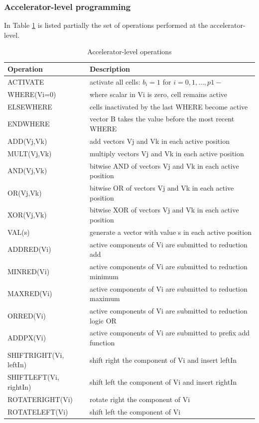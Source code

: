 \subsubsection{Accelerator-level programming}

In Table \ref{ops} is listed partially the set of operations performed at the accelerator-level.


\begin{table}[h]
	\centering                       
	\caption{Accelerator-level operations}           
	\label{ops}       %

	\begin{tabular}{|l|l|} \hline  %
		Operation & Description  \\ \hline \hline
        ACTIVATE    & activate all cells: $b_i=1$ for $i = 0,1,\ldots ,p1-$ \\ \hline
        WHERE(Vi=0) & where scalar in Vi is zero, cell remains active \\ \hline
        ELSEWHERE & cells inactivated by the last WHERE become active \\ \hline
        ENDWHERE & vector B takes the value before the most recent WHERE \\ \hline
		ADD(Vj,Vk) & add vectors Vj and Vk in each active position   \\ \hline
		MULT(Vj,Vk) & multiply vectors Vj and Vk in each active position   \\ \hline
        AND(Vj,Vk) & bitwise AND of vectors Vj and Vk in each active position  \\ \hline
        OR(Vj,Vk) & bitwise OR of vectors Vj and Vk in each active position  \\ \hline
        XOR(Vj,Vk) & bitwise XOR of vectors Vj and Vk in each active position  \\ \hline
        VAL(s) & generate a vector with value s in each active position \\ \hline
        ADDRED(Vi) & active components of Vi are submitted to reduction add \\ \hline
        MINRED(Vi) & active components of Vi are submitted to reduction minimum \\ \hline
        MAXRED(Vi) & active components of Vi are submitted to reduction maximum \\ \hline
        ORRED(Vi) & active components of Vi are submitted to reduction logic OR \\ \hline
        ADDPX(Vi) & active components of Vi are submitted to prefix add function \\ \hline
        SHIFTRIGHT(Vi, leftIn) & shift right the component of Vi and insert leftIn \\ \hline
        SHIFTLEFT(Vi, rightIn) & shift left the component of Vi and insert rightIn \\ \hline
        ROTATERIGHT(Vi) & rotate right the component of Vi \\ \hline
        ROTATELEFT(Vi) & shift left the component of Vi \\ \hline
	\end{tabular}

\end{table}


